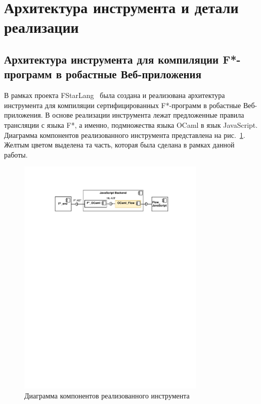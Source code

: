 \documentclass[12pt]{matmex-diploma}
\begin{document}
\section{Архитектура инструмента и детали реализации}

\subsection{Архитектура инструмента для компиляции F*-программ в робастные Веб-приложения}

В рамках проекта FStarLang~\cite{fstargh} была создана и реализована архитектура инструмента для компиляции сертифицированных F*-программ в робастные Веб-приложения. В основе реализации инструмента лежат предложенные правила трансляции с языка F*, а именно, подмножества языка OCaml в язык JavaScript. Диаграмма компонентов реализованного инструмента представлена на рис.~\ref{fig:arch_js}. Желтым цветом выделена та часть, которая была сделана в рамках данной работы.

\begin{figure}[h!]
\begin{center}
\includegraphics[width=0.8\textwidth]{DiagComp}
\caption{Диаграмма компонентов реализованного инструмента}
\label{fig:arch_js} 
\end{center}
\end{figure}
\end{document}
